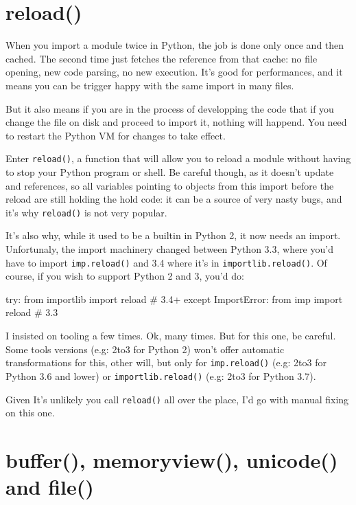\section{reload()}

When you import a module twice in Python, the job is done only once and then cached. The second time just fetches the reference from that cache: no file opening, new code parsing, no new execution. It's good for performances, and it means you can be trigger happy with the same import in many files.

But it also means if you are in the process of developping the code that if you change the file on disk and proceed to import it, nothing will happend. You need to restart the Python VM for changes to take effect.

Enter \lstinline{reload()}, a function that will allow you to reload a module without having to stop your Python program or shell. Be careful though, as it doesn't update and references, so all variables pointing to objects from this import before the reload are still holding the hold code: it can be a source of very nasty bugs, and it's why \lstinline{reload()} is not very popular.

It's also why, while it used to be a builtin in Python 2, it now needs an import. Unfortunaly, the import machinery changed between Python 3.3, where you'd have to import \lstinline{imp.reload()} and 3.4 where it's in \lstinline{importlib.reload()}. Of course, if you wish to support Python 2 and 3, you'd do:

\begin{py2and3}
try:
    from importlib import reload # 3.4+
except ImportError:
    from imp import reload # 3.3
\end{py2and3}

I insisted on tooling a few times. Ok, many times. But for this one, be careful. Some tools versions (e.g: 2to3 for Python 2) won't offer automatic transformations for this, other will, but only for \lstinline{imp.reload()} (e.g: 2to3 for Python 3.6 and lower) or \lstinline{importlib.reload()} (e.g: 2to3 for Python 3.7).

Given It's unlikely you call \lstinline{reload()} all over the place, I'd go with manual fixing on this one.

\section{buffer(), memoryview(), unicode() and file()}

